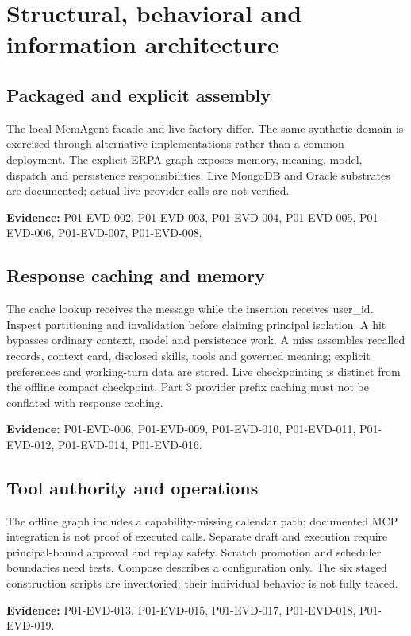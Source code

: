 \documentclass[10pt,letterpaper]{article}
\begin{document}
\section{Structural, behavioral and information architecture}
\subsection{Packaged and explicit assembly}
The local MemAgent facade and live factory differ. The same synthetic domain is exercised through alternative implementations rather than a common deployment. The explicit ERPA graph exposes memory, meaning, model, dispatch and persistence responsibilities. Live MongoDB and Oracle substrates are documented; actual live provider calls are not verified.\par\textbf{Evidence:} P01-EVD-002, P01-EVD-003, P01-EVD-004, P01-EVD-005, P01-EVD-006, P01-EVD-007, P01-EVD-008.\par

\subsection{Response caching and memory}
The cache lookup receives the message while the insertion receives user\_id. Inspect partitioning and invalidation before claiming principal isolation. A hit bypasses ordinary context, model and persistence work. A miss assembles recalled records, context card, disclosed skills, tools and governed meaning; explicit preferences and working-turn data are stored. Live checkpointing is distinct from the offline compact checkpoint. Part 3 provider prefix caching must not be conflated with response caching.\par\textbf{Evidence:} P01-EVD-006, P01-EVD-009, P01-EVD-010, P01-EVD-011, P01-EVD-012, P01-EVD-014, P01-EVD-016.\par

\subsection{Tool authority and operations}
The offline graph includes a capability-missing calendar path; documented MCP integration is not proof of executed calls. Separate draft and execution require principal-bound approval and replay safety. Scratch promotion and scheduler boundaries need tests. Compose describes a configuration only. The six staged construction scripts are inventoried; their individual behavior is not fully traced.\par\textbf{Evidence:} P01-EVD-013, P01-EVD-015, P01-EVD-017, P01-EVD-018, P01-EVD-019.\par
\end{document}
